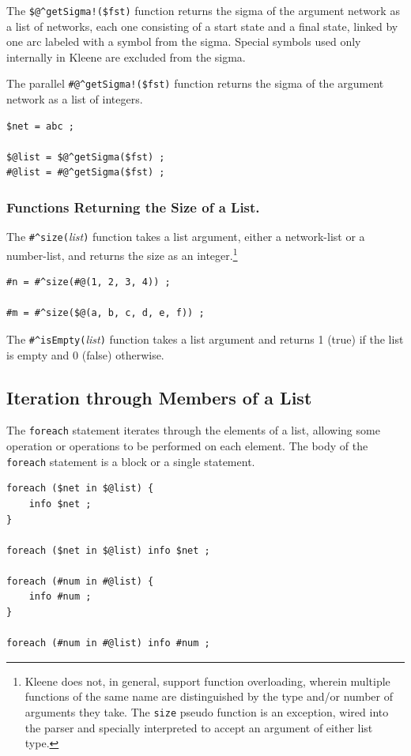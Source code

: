 \documentclass[letterpaper,12pt]{article}
\begin{document}
The \verb+$@^getSigma!($fst)+ function returns the sigma of the argument
network as a list of networks, each one consisting of a start state and a final
state, linked by one arc labeled with a symbol from the sigma.  Special symbols
used only internally in Kleene are excluded from the sigma.

The parallel \verb+#@^getSigma!($fst)+ function returns the sigma of the argument
network as a list of integers.

\begin{Verbatim}[fontsize=\small]
$net = abc ;

$@list = $@^getSigma($fst) ;
#@list = #@^getSigma($fst) ;
\end{Verbatim}

\subsubsection{Functions Returning the Size of a List.}

The \verb+#^size(+\textit{list}\verb!)! function takes a list argument,
either a network-list or a number-list, and returns the
size as an integer.\footnote{Kleene does not, in general, support function
overloading, wherein multiple functions of the same name are distinguished
by the type and/or number of arguments they take.
The \texttt{size} pseudo function is an exception,
wired into the parser and specially interpreted to accept an argument of either list
type.}

\begin{Verbatim}[fontsize=\small]
#n = #^size(#@(1, 2, 3, 4)) ;

#m = #^size($@(a, b, c, d, e, f)) ;
\end{Verbatim}

The \verb!#^isEmpty(!\emph{list}\verb!)! function takes a list argument and
returns 1 (true) if the list is empty and 0 (false) otherwise.

\subsection{Iteration through Members of a List}


The \texttt{foreach} statement iterates through the elements of a list, allowing
some operation or operations to be performed on each element.  The body of
the \texttt{foreach} statement is a block or a single statement.

\begin{Verbatim}[fontsize=\small]
foreach ($net in $@list) {
    info $net ;
}

foreach ($net in $@list) info $net ;

foreach (#num in #@list) {
    info #num ;
}

foreach (#num in #@list) info #num ;
\end{Verbatim}
\end{document}
